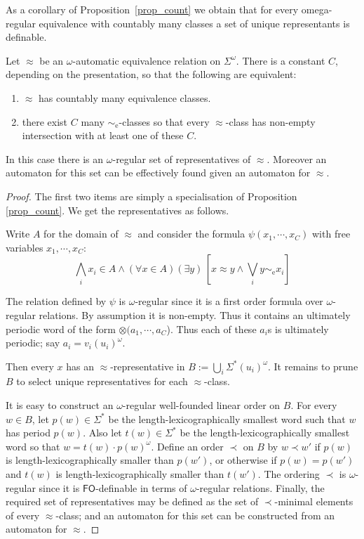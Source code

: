 \documentclass{stacs_proc}
\newcommand{\FO}{\mathsf{FO}}
\newcommand{\eqe}{\sim_{\textrm{e}}}
\begin{document}
As a corollary of Proposition~\ref{prop_count} we obtain that for every 
omega-regular equivalence with countably many classes a set of unique representants 
is definable.

\begin{corollary}
Let $\approx$ be an $\omega$-automatic equivalence relation on $\Sigma^\omega$.
There is a constant $C$, depending on the presentation, so that 
the following are equivalent:
\begin{enumerate}
\item $\approx$ has countably many equivalence classes.
\item there exist $C$ many $\eqe$-classes so that every $\approx$-class 
has non-empty intersection with at least one of these $C$. 
\end{enumerate}
In this case there is an $\omega$-regular set of representatives of $\approx$.
Moreover an automaton for this set can be effectively found given an automaton
for $\approx$.
\end{corollary}

\begin{proof}
The first two items are simply a specialisation of Proposition \ref{prop_count}.
We get the representatives as follows.

Write $A$ for the domain of $\approx$ and 
consider the formula $\psi(x_1,\cdots,x_C)$ with free variables $x_1,\cdots,x_C$:
\[
\bigwedge_i x_i \in A \land (\forall x \in A) (\exists y)\, [x \approx y \land \bigvee_i y \eqe x_i]
\]

The relation defined by $\psi$ is $\omega$-regular since it is a first order
formula over $\omega$-regular relations. By assumption it is non-empty. Thus it
contains an ultimately periodic word of the form $\otimes(a_1,\cdots,a_C$).
Thus each of these $a_i$s is ultimately periodic; say $a_i = v_i (u_i)^\omega$.

Then every $x$ has an $\approx$-representative in $B:=\bigcup_i \Sigma^{\ast}
(u_i)^\omega$. It remains to prune $B$ to select unique representatives for
each $\approx$-class.  

It is easy to construct an $\omega$-regular well-founded linear
order on $B$.  For every $w \in B$, let $p(w) \in \Sigma^\ast$ be the
length-lexicographically smallest word such that $w$ has period $p(w)$. Also
let $t(w) \in \Sigma^\ast$ be the length-lexicographically smallest word so
that $w = t(w) \cdot p(w)^{\omega}$. Define an order $\prec$ on $B$ by $w \prec
w'$ if $p(w)$ is length-lexicographically smaller than $p(w')$, or otherwise if
$p(w) = p(w')$ and $t(w)$ is length-lexicographically smaller than $t(w')$.
The ordering $\prec$ is $\omega$-regular since it is $\FO$-definable in terms
of $\omega$-regular relations. Finally, the required set of representatives may be 
defined as the set of $\prec$-minimal elements of every $\approx$-class;
and an automaton for this set can be constructed from an automaton for 
$\approx$.
\end{proof}
\end{document}
